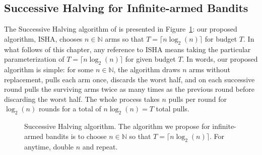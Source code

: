 




\subsection{Successive Halving for Infinite-armed Bandits}\label{theory}
The Successive Halving algorithm of \cite{icml2013_karnin13} is presented in Figure~\ref{alg-SH}: our proposed algorithm, ISHA,
	chooses $n \in \mathbb{N}$ arms so that $T=\lceil n\log_2(n)\rceil$
	for budget $T$.
In what follows of this chapter, any reference to ISHA means taking the particular parameterization of $T=\lceil n \log_2(n) \rceil$ for given budget $T$.
In words, our proposed algorithm is simple: for some $n \in \mathbb{N}$, the algorithm draws $n$ arms without replacement, pulls each arm once, discards the worst half, and on each successive round pulls the surviving arms twice as many times as the previous round before discarding the worst half. The whole process takes $n$ pulls per round for $\log_2(n)$ rounds for a total of $n \log_2(n) = T$ total pulls.

\begin{figure}[h]
\centering
{}
\caption{Successive Halving algorithm. The algorithm we propose for infinite-armed bandits is to choose $n \in \mathbb{N}$ so that $T = \lceil n \log_2(n) \rceil$. For anytime, double $n$ and repeat.}\label{alg-SH}
\end{figure}


